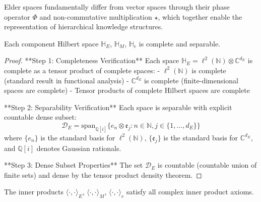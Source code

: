 Elder spaces fundamentally differ from vector spaces through their phase operator $\Phi$ and non-commutative multiplication $\star$, which together enable the representation of hierarchical knowledge structures.

\begin{theorem}
Each component Hilbert space $\mathbb{H}_E$, $\mathbb{H}_M$, $\mathbb{H}_e$ is complete and separable.
\end{theorem}

\begin{proof}
**Step 1: Completeness Verification**
Each space $\mathbb{H}_E = \ell^2(\mathbb{N}) \otimes \mathbb{C}^{d_E}$ is complete as a tensor product of complete spaces:
- $\ell^2(\mathbb{N})$ is complete (standard result in functional analysis)
- $\mathbb{C}^{d_E}$ is complete (finite-dimensional spaces are complete)
- Tensor products of complete Hilbert spaces are complete

**Step 2: Separability Verification**
Each space is separable with explicit countable dense subset:
$$\mathcal{D}_E = \text{span}_{\mathbb{Q}[i]} \{e_n \otimes \mathfrak{e}_j : n \in \mathbb{N}, j \in \{1, \ldots, d_E\}\}$$
where $\{e_n\}$ is the standard basis for $\ell^2(\mathbb{N})$, $\{\mathfrak{e}_j\}$ is the standard basis for $\mathbb{C}^{d_E}$, and $\mathbb{Q}[i]$ denotes Gaussian rationals.

**Step 3: Dense Subset Properties**
The set $\mathcal{D}_E$ is countable (countable union of finite sets) and dense by the tensor product density theorem.
\end{proof}

\begin{theorem}
The inner products $\langle \cdot, \cdot \rangle_E$, $\langle \cdot, \cdot \rangle_M$, $\langle \cdot, \cdot \rangle_e$ satisfy all complex inner product axioms.
\end{theorem}

